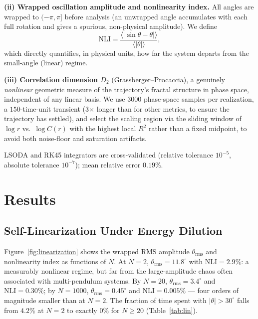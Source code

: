 \documentclass[aps,pre,12pt]{revtex4-2}
\begin{document}
\textbf{(ii) Wrapped oscillation amplitude and nonlinearity index.} All angles are wrapped to $(-\pi,\pi]$ before analysis (an unwrapped angle accumulates with each full rotation and gives a spurious, non-physical amplitude). We define
\begin{equation}
    \text{NLI} = \frac{\langle|\sin\theta-\theta|\rangle}{\langle|\theta|\rangle},
\end{equation}
which directly quantifies, in physical units, how far the system departs from the small-angle (linear) regime.

\textbf{(iii) Correlation dimension $D_2$} (Grassberger--Procaccia), a genuinely \emph{nonlinear} geometric measure of the trajectory's fractal structure in phase space, independent of any linear basis. We use 3000 phase-space samples per realization, a $150$-time-unit transient (3$\times$ longer than for other metrics, to ensure the trajectory has settled), and select the scaling region via the sliding window of $\log r$ vs.\ $\log C(r)$ with the highest local $R^2$ rather than a fixed midpoint, to avoid both noise-floor and saturation artifacts.

LSODA and RK45 integrators are cross-validated (relative tolerance $10^{-5}$, absolute tolerance $10^{-7}$); mean relative error $0.19\%$.

\section{Results}

\subsection{Self-Linearization Under Energy Dilution}

Figure~\ref{fig:linearization} shows the wrapped RMS amplitude $\theta_{\text{rms}}$ and nonlinearity index as functions of $N$. At $N=2$, $\theta_{\text{rms}}=11.8^\circ$ with $\text{NLI}=2.9\%$: a measurably nonlinear regime, but far from the large-amplitude chaos often associated with multi-pendulum systems. By $N=20$, $\theta_{\text{rms}}=3.4^\circ$ and $\text{NLI}=0.30\%$; by $N=1000$, $\theta_{\text{rms}}=0.45^\circ$ and $\text{NLI}=0.005\%$ --- four orders of magnitude smaller than at $N=2$. The fraction of time spent with $|\theta|>30^\circ$ falls from $4.2\%$ at $N=2$ to exactly $0\%$ for $N\ge20$ (Table~\ref{tab:lin}).
\end{document}
